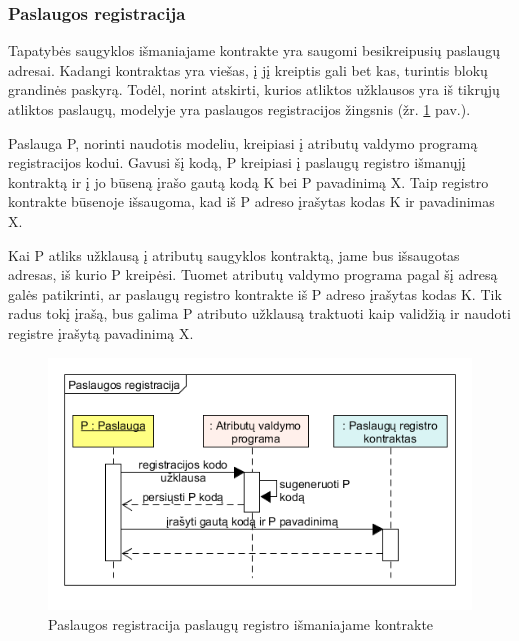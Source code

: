 \subsubsection{Paslaugos registracija} \label{BCIDM:serviceRegistration}

Tapatybės saugyklos išmaniajame kontrakte yra saugomi besikreipusių paslaugų adresai. Kadangi kontraktas yra viešas,
į jį kreiptis gali bet kas, turintis blokų grandinės paskyrą. Todėl, norint atskirti, kurios atliktos užklausos yra iš tikrųjų
atliktos paslaugų, modelyje yra paslaugos registracijos žingsnis (žr. \hypertarget{fig:serviceRegistration}{\ref{fig:serviceRegistration}} pav.).

Paslauga P, norinti naudotis modeliu, kreipiasi į atributų valdymo programą registracijos kodui. Gavusi šį kodą,
P kreipiasi į paslaugų registro išmanųjį kontraktą ir į jo būseną įrašo gautą kodą K bei P pavadinimą X. Taip registro
kontrakte būsenoje išsaugoma, kad iš P adreso įrašytas kodas K ir pavadinimas X.

Kai P atliks užklausą į atributų
saugyklos kontraktą, jame bus išsaugotas adresas, iš kurio P kreipėsi. Tuomet atributų valdymo programa pagal šį adresą
galės patikrinti, ar paslaugų registro kontrakte iš P adreso įrašytas kodas K.
Tik radus tokį įrašą, bus galima P atributo užklausą traktuoti kaip validžią ir naudoti registre įrašytą pavadinimą X.

\begin{figure}[H]
    \centering
    \includegraphics[scale=0.6]{img/serviceRegistration}
    \caption{Paslaugos registracija paslaugų registro išmaniajame kontrakte}
    \label{fig:serviceRegistration}
\end{figure}